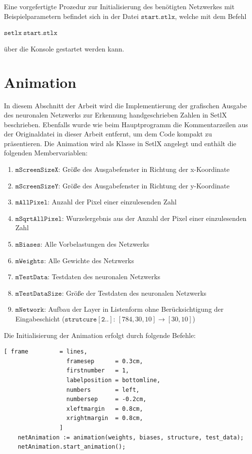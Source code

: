 \noindent
Eine vorgefertigte Prozedur zur Initialisierung des benötigten Netzwerkes mit Beispielparametern befindet sich in der Datei $\mathtt{start.stlx}$, welche mit dem Befehl 
\begin{center}
	$\mathtt{setlx\ start.stlx}$ 
\end{center}
über die Konsole gestartet werden kann.

\section{Animation}
In diesem Abschnitt der Arbeit wird die Implementierung der grafischen Ausgabe des neuronalen Netzwerks zur Erkennung handgeschrieben Zahlen in SetlX beschrieben. Ebenfalls wurde wie beim Hauptprogramm die Kommentarzeilen aus der Originaldatei in dieser Arbeit entfernt, um dem Code kompakt zu präsentieren. Die Animation wird als Klasse in SetlX angelegt und enthält die folgenden Membervariablen:
\begin{enumerate}
	\item $\mathtt{mScreenSizeX}$: Größe des Ausgabefenster in Richtung der x-Koordinate
	\item $\mathtt{mScreenSizeY}$: Größe des Ausgabefenster in Richtung der y-Koordinate
	\item $\mathtt{mAllPixel}$: Anzahl der Pixel einer einzulesenden Zahl
	\item $\mathtt{mSqrtAllPixel}$: Wurzelergebnis aus der Anzahl der Pixel einer einzulesenden Zahl
	\item $\mathtt{mBiases}$: Alle Vorbelastungen des Netzwerks
	\item $\mathtt{mWeights}$: Alle Gewichte des Netzwerks
	\item $\mathtt{mTestData}$: Testdaten des neuronalen Netzwerks
	\item $\mathtt{mTestDataSize}$: Größe der Testdaten des neuronalen Netzwerks
	\item $\mathtt{mNetwork}$: Aufbau der Layer in Listenform ohne Berücksichtigung der Eingabeschicht ($\mathtt{strutcure[2..]}$: $[784,30,10] \rightarrow [30,10]$)
\end{enumerate}
Die Initialisierung der Animation erfolgt durch folgende Befehle:
\begin{Verbatim}[ frame         = lines, 
                  framesep      = 0.3cm, 
                  firstnumber   = 1,
                  labelposition = bottomline,
                  numbers       = left,
                  numbersep     = -0.2cm,
                  xleftmargin   = 0.8cm,
                  xrightmargin  = 0.8cm,
                ]
    netAnimation := animation(weights, biases, structure, test_data);
    netAnimation.start_animation();
\end{Verbatim}
